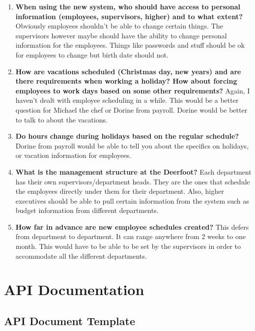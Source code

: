 \documentclass[letterpaper,12pt]{report}
\begin{document}
\begin{enumerate}
 \item \textbf{When using the new system, who should have access to personal information (employees, supervisors, higher) and to what extent?}\newline
 Obviously employees shouldn’t be able to change certain things. The supervisors however maybe should have the ability to change personal information for the employees. Things like passwords and stuff should be ok for employees to change but birth date should not.
 \item \textbf{How are vacations scheduled (Christmas day, new years) and are there requirements when working a holiday? How about forcing employees to work days based on some other requirements?}\newline
 Again, I haven’t dealt with employee scheduling in a while. This would be a better question for Michael the chef or Dorine from payroll. Dorine would be better to talk to about the vacations.
 \item \textbf{Do hours change during holidays based on the regular schedule?}\newline
 Dorine from payroll would be able to tell you about the specifics on holidays, or vacation information for employees.

 \item \textbf{What is the management structure at the Deerfoot?}\newline
 Each department has their own supervisors/department heads. They are the ones that schedule the employees directly under them for their department. Also, higher executives should be able to pull certain information from the system such as budget information from different departments.
 \item \textbf{How far in advance are new employee schedules created?}\newline
 This defers from department to department. It can range anywhere from 2 weeks to one month. This would have to be able to be set by the supervisors in order to accommodate all the different departments.
\end{enumerate}

\chapter{API Documentation}
\newpage
\section{API Document Template}
\end{document}
